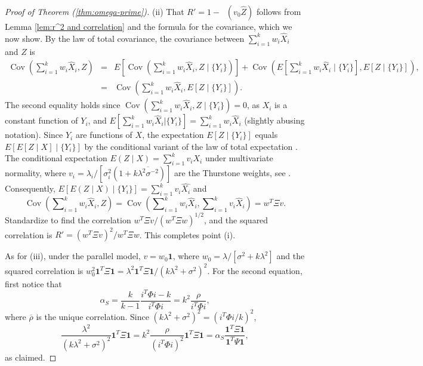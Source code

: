 \documentclass[twoside]{article}
\DeclareMathOperator{\Cov}{Cov}
\DeclareMathOperator{\MSE}{MSE_Z}
\DeclareMathOperator{\tsum}{\textstyle \sum}
\renewcommand{\sqrt}[1]{{(#1)^{1/2}}}
\begin{document}
\begin{proof}[Proof of Theorem (\ref{thm:omega-prime})]
\label{proof:omega-prime}(ii) That $ R'=1-\MSE(v_{0}\hat{Z})$
follows from Lemma \ref{lem:r^2 and correlation} and the formula
for the covariance, which we now show. By the law of total covariance, the covariance between $\tsum_{i=1}^{k}w_{i}\hat{X}_{i}$
and $Z$ is
\begin{eqnarray*}
\Cov(\tsum_{i=1}^{k}w_{i}\hat{X}_{i},Z) & = & E[\Cov(\tsum_{i=1}^{k}w_{i}\hat{X}_{i},Z\mid\{Y_{i}\})]+\Cov(E[\tsum_{i=1}^{k}w_{i}\hat{X}_{i}\mid\{Y_{i}\}],E[Z\mid\{Y_{i}\}]),\\
 & = & \Cov(\tsum_{i=1}^{k}w_{i}\hat{X}_{i},E[Z\mid\{Y_{i}\}]).
\end{eqnarray*}
The second equality holds since $\Cov(\tsum_{i=1}^{k}w_{i}\hat{X}_{i},Z\mid\{Y_{i}\}) = 0$, as $X_i$ is a constant function of $Y_i$, and $E[\tsum_{i=1}^{k}w_{i}\hat{X}_{i}| \{Y_{i}\}] = \tsum_{i=1}^{k}w_{i}\hat{X}_{i}$ (slightly abusing notation).
Since ${Y_i}$ are functions of $X$, the expectation $E[Z\mid\{Y_{i}\}]$ equals $E[E[Z\mid X]\mid\{Y_{i}\}]$ by the conditional variant of the law of total expectation \citep[][Theorem 34.4]{Billingsley1995-pp}.
The conditional expectation $E(Z\mid X)=\tsum_{i=1}^{k}v_{i}X_{i}$
under multivariate normality, where $v_{i}=\lambda_{i}/[\sigma_{i}^{2}(1+k\overline{\lambda^{2}\sigma^{-2}})]$
are the Thurstone weights, see \citet[Theorem 3.3.4]{Tong1990-lm}.
Consequently, $E[E(Z\mid X)\mid\{Y_{i}\}]=\tsum_{i=1}^{k}v_{i}\hat{X_{i}}$
and 
\begin{equation*}
\Cov(\tsum_{i=1}^{k}w_{i}\hat{X}_{i},Z) =  \Cov(\tsum_{i=1}^{k}w_{i}\hat{X}_{i},\tsum_{i=1}^{k}v_{i}\hat{X}_{i})=w^{T}\Xi v.
\end{equation*}
Standardize to find the correlation $w^{T}\Xi v/\sqrt{w^{T}\Xi w}$,
and the squared correlation is $ R'=(w^{T}\Xi v)^{2}/w^{T}\Xi w$.
This completes point (i). 

As for (iii), under the parallel model, $v=w_{0}\boldsymbol{1}$, where
$w_{0}=\lambda/[\sigma^{2}+k\lambda^{2}]$ and the squared correlation
is $w_{0}^{2}\boldsymbol{1}^{T}\Xi\boldsymbol{1}=\lambda^{2}\boldsymbol{1}^{T}\Xi\boldsymbol{1}/(k\lambda^{2}+\sigma^{2})^{2}$.
For the second equation, first notice that
\[
\alpha_S=\frac{k}{k-1}\frac{i^{T}\Phi i-k}{i^{T}\Phi i}=k^{2}\frac{\rho}{i^{T}\Phi i},
\]
where $\overline{\rho}$ is the unique correlation. Since $(k\lambda^{2}+\sigma^{2})^{2}=(i^{T}\Phi i/k)^{2}$, 
\begin{equation}
\frac{\lambda^{2}}{(k\lambda^{2}+\sigma^{2})^{2}}\boldsymbol{1}^{T}\Xi\boldsymbol{1} =  k^{2}\frac{\rho}{(i^{T}\Phi i)^{2}}\boldsymbol{1}^{T}\Xi\boldsymbol{1} =  \alpha_S\frac{\boldsymbol{1}^{T}\Xi\boldsymbol{1}}{\boldsymbol{1}^{T}\Psi\boldsymbol{1}},\nonumber
\end{equation}
as claimed.


\end{proof}
\end{document}
